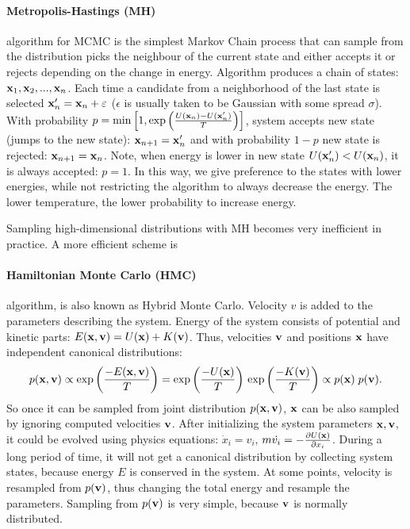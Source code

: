 \paragraph{Metropolis-Hastings (MH)} algorithm for MCMC is the simplest Markov Chain process that can sample from the distribution picks the neighbour of the current state and either accepts it or rejects depending on the change in energy. 
Algorithm produces a chain of states: $ \mathbf{x}_1, \mathbf{x}_2, ..., \mathbf{x}_n $. Each time a candidate from a neighborhood of the last state is selected
$\mathbf{x}_n' = \mathbf{x}_n + \varepsilon$ ($\epsilon$ is usually taken to be Gaussian with some spread $\sigma$).
With probability $p = \min \left[1, \exp\left( \frac{U(\mathbf{x}_n) - U(\mathbf{x}_n')}{T} \right) \right]$, system accepts new state (jumps to the new state):
$\mathbf{x}_{n+1} = \mathbf{x}_n'$ and with probability $1-p$ new state is rejected: $\mathbf{x}_{n+1} = \mathbf{x}_n$.
Note, when energy is lower in new state $U(\mathbf{x}'_n) < U(\mathbf{x}_n)$, it is always accepted: $p=1$.
In this way, we give preference to the states with lower energies, while not restricting the algorithm to always decrease the energy.
The lower temperature, the lower probability to increase energy.

Sampling high-dimensional distributions with MH becomes very inefficient in practice. A more efficient scheme is

\paragraph{Hamiltonian Monte Carlo (HMC)} algorithm, is also known as Hybrid Monte Carlo. Velocity $v$ is added to the parameters describing the system. Energy of the system consists of potential and kinetic parts:	$E(\mathbf{x}, \mathbf{v}) = U(\mathbf{x}) + K(\mathbf{v})$. %
Thus, velocities $\mathbf{v}$ and positions $\mathbf{x}$ have independent canonical distributions:
\begin{equation}
	p(\mathbf{x}, \mathbf{v}) \propto \exp\left(  \frac{-E(\mathbf{x}, \mathbf{v})}{T}  \right)
	= \exp\left(  \frac{-U(\mathbf{x})}{T}  \right) \, \exp \left( \frac{-K(\mathbf{v})}{T} \right) \propto p(\mathbf{x}) \; p(\mathbf{v}).
\end{equation}
So once it can be sampled from joint distribution $p(\mathbf{x}, \mathbf{v})$, $\mathbf{x}$ can be also sampled by ignoring computed velocities $\mathbf{v}$.
After initializing the system parameters $\mathbf{x}, \mathbf{v}$, it could be evolved using physics equations: $\dot{x}_i = v_i$, $m\dot{v_i} = -\frac{\partial U(\mathbf{x})}{\partial x_i}$. During a long period of time, it will not get a canonical distribution by collecting system states, because energy $E$ is conserved in the system.
At some points, velocity is resampled from $p(\mathbf{v})$, thus changing the total energy and resample the parameters. Sampling from $p(\mathbf{v})$ is very simple, because $\mathbf{v}$ is normally distributed.

